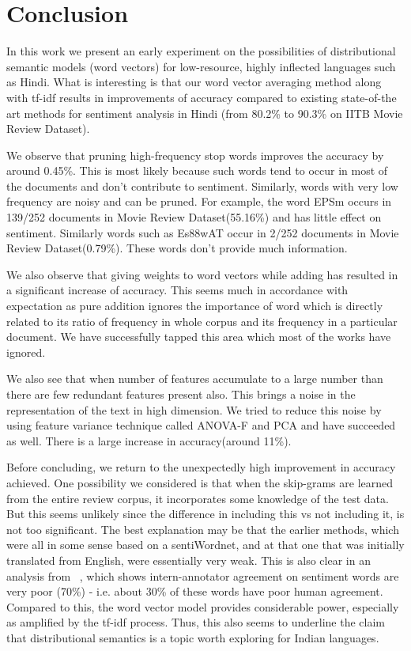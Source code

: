 \documentclass[11pt,a4paper]{article}
\begin{document}
\section{Conclusion}
\label{sec:conclusion}
In this work we present an early experiment on the possibilities of distributional semantic models (word vectors) for low-resource, highly inflected languages such as Hindi.  What is interesting is that our word vector averaging method along with tf-idf results in improvements of accuracy compared to existing state-of-the art methods for sentiment analysis in Hindi (from 80.2\% to 90.3\% on IITB Movie Review Dataset).

We observe that pruning high-frequency stop words improves the accuracy by around 0.45\%. This is most likely  because such words tend to occur in most of the documents and don't contribute to sentiment.  Similarly, words with very low frequency are noisy and can be pruned. For example, the word {\dn EPSm} occurs in 139/252 documents in Movie Review Dataset(55.16\%) and has little effect on sentiment.
Similarly words such as {\dn Es\388wAT\0} occur in 2/252 documents in Movie Review Dataset(0.79\%). These words don't provide much information.

We also observe that giving weights to word vectors while adding has resulted in a significant increase of accuracy. This seems much in accordance with expectation as pure addition ignores the importance of word which is directly related to its ratio of frequency in whole corpus and its frequency in a particular document. We have successfully tapped this area which most of the works have ignored.

We also see that when number of features accumulate to a large number than there are few redundant features present also. This brings a noise in the representation of the text in high dimension. We tried to reduce this noise by using feature variance technique called ANOVA-F and PCA and have succeeded as well. There is a large increase in accuracy(around 11\%).

Before concluding, we return to the unexpectedly high improvement in accuracy achieved. One possibility we considered is that when the skip-grams are learned from the entire review corpus, it incorporates some knowledge of the test data.  But this seems unlikely since the difference in including this vs not including it, is not too significant.  The best explanation may be that the earlier methods, which were all in some sense based on a sentiWordnet, and at that one that was initially translated from English, were essentially very weak.  This is also clear in an analysis from
~\cite{Bakliwal:12}, which shows intern-annotator agreement on sentiment words are very poor (70\%) - i.e. about 30\% of these words have poor human agreement. Compared to this, the word vector model  
provides considerable power, especially as amplified by the tf-idf process. Thus, this also seems to underline the claim that distributional semantics is a topic worth exploring for Indian languages.
\end{document}
